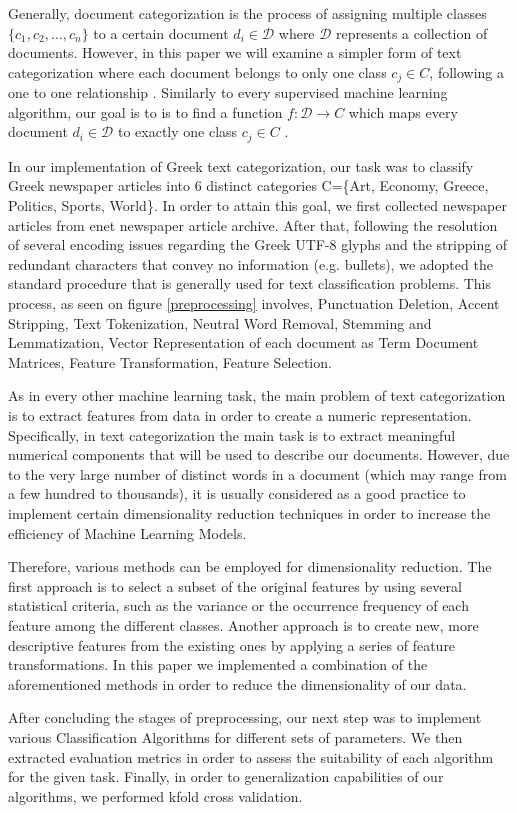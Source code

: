 \documentclass[10pt,journal,compsoc]{IEEEtran}
\begin{document}
\par
Generally, document categorization is the process of assigning
multiple classes $\{c_1,c_2,...,c_n\}$ to a certain document
$d_i\in \mathcal{D}$ where $\mathcal{D}$ represents a 
collection of documents.
However, in this paper we will examine a simpler form 
of text categorization where each document belongs to only 
one class $c_j\in C$, 
following a one to one relationship \cite{a1}.
Similarly to every supervised machine learning algorithm,
our goal is to is to find a function $f: \mathcal{D}\rightarrow C$
which maps every document $d_i\in \mathcal{D}$ to exactly one
class $c_j \in C$ .
\par
In our implementation of Greek text categorization, our task
was to classify Greek newspaper articles into 6 distinct 
categories C=\{Art, Economy, Greece, Politics, Sports, World\}.
In order to attain this goal, we first collected newspaper articles
from enet newspaper article archive.
After that, following the resolution of several encoding issues 
regarding the Greek UTF-8 glyphs and the stripping of redundant
characters that convey no information (e.g. bullets), we adopted
the standard procedure that is generally used for text classification
problems.
This process, as seen on figure \ref{preprocessing} involves, 
Punctuation Deletion, Accent Stripping, Text Tokenization, 
Neutral Word Removal, Stemming and Lemmatization, 
Vector Representation of each document as Term Document Matrices, 
Feature Transformation, Feature Selection.
\par
As in every other machine learning task, the main problem of text
categorization is to extract features from data in order to create
a numeric representation.
Specifically, in text categorization the main task is to extract
meaningful numerical components that will be used to describe
our documents.
However, due to the very large number of distinct words in a
document (which may range from a few hundred to thousands), 
it is usually considered as a good practice to
implement certain dimensionality reduction techniques in
order to increase the efficiency of Machine Learning Models.
\par
Therefore, various methods can be employed for dimensionality 
reduction.
The first approach is to select a subset of the original features
by using several statistical criteria, such as the variance
or the occurrence frequency of each feature among the 
different classes.
Another approach is to create new, more descriptive features
from the existing ones by applying a series of feature 
transformations.
In this paper we implemented a combination of the aforementioned
methods in order to reduce the dimensionality of our data.
\par
After concluding the stages of preprocessing, our next step
was to implement various Classification Algorithms for different
sets of parameters.
We then extracted evaluation metrics in order to assess the
suitability of each algorithm for the given task.
Finally, in order to generalization capabilities of our algorithms,
we performed kfold cross validation.
\end{document}
